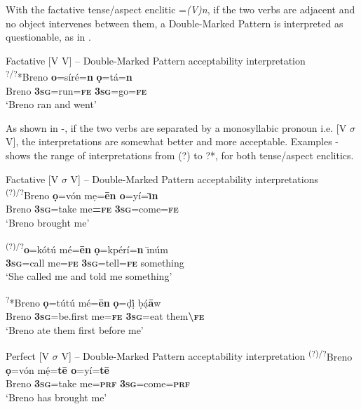 \documentclass[output=paper]{langsci/langscibook}
\begin{document}
With the factative tense/aspect enclitic =\textit{(V)n}, if the two verbs are adjacent and no object intervenes between them, a Double-Marked Pattern is interpreted as questionable, as in . 

\ea\label{ex:rolle:23}
{Factative [V V] – Double-Marked Pattern acceptability interpretation}\\
\gll  \textsuperscript{?/?}*Breno   \textbf{o}=síré=\textbf{n}     \textbf{ọ}=tá=\textbf{n}\\
     Breno  \textbf{\textsc{3sg}}=run=\textbf{\textsc{fe}}    \textbf{\textsc{3sg}}=go=\textbf{\textsc{fe}}\\
\glt ‘Breno ran and went’
\z

As shown in -, if the two verbs are separated by a monosyllabic pronoun i.e. [V $\sigma $ V], the interpretations are somewhat better and more acceptable. Examples - shows the range of interpretations from (?) to ?*, for both tense/aspect enclitics.



\ea\label{ex:rolle:24}
{Factative [V $\sigma $ V] – Double-Marked Pattern acceptability interpretations} \\
\gll   \textsuperscript{(?)/?}Breno  \textbf{ọ}=vón  mẹ=\textbf{\=en  o}=yí=\textbf{\={\i}n}\\
         Breno  \textbf{\textsc{3}\textsc{sg}}=take  me\textbf{=}\textbf{\textsc{fe}} \textbf{\textsc{3sg}}=come=\textbf{\textsc{fe}}\\
\glt ‘Breno brought me’
\z

\ea\label{ex:rolle:25}
\gll   \textsuperscript{(?)/?}\textbf{o}=kótú    mé=\textbf{\=en}   \textbf{ọ}=kpérí=\textbf{n}   \={\i}núm\\
         \textbf{\textsc{3sg}}=call    me=\textbf{\textsc{fe}} \textbf{\textsc{3sg}}=tell=\textbf{\textsc{fe}}  something\\
\glt ‘She called me and told me something’
\z

\ea\label{ex:rolle:26}
\gll   \textsuperscript{?}*Breno   \textbf{ọ}=tútú     mé=\textbf{ēn}  \textbf{ọ}=ḍị́   ḅạ́\textbf{ā}w\\
         Breno  \textbf{\textsc{3sg}}=be.first  me=\textbf{\textsc{fe   3sg}}=eat  them\textbf{{\textbackslash}}\textbf{\textsc{fe}}\\
\glt ‘Breno ate them first before me’
\z

\ea\label{ex:rolle:27}
{Perfect [V $\sigma $ V] – Double-Marked Pattern acceptability interpretation}
\gll  \textsuperscript{(?)/?}Breno   \textbf{ọ}=vón     mẹ́=\textbf{t\=e     o}=yí=\textbf{t\=e}\\
       Breno   \textbf{\textsc{3sg}}=take   me=\textbf{\textsc{prf}} \textbf{\textsc{3sg}}=come=\textbf{\textsc{prf}}\\
\glt ‘Breno has brought me’ 
\z
\end{document}
